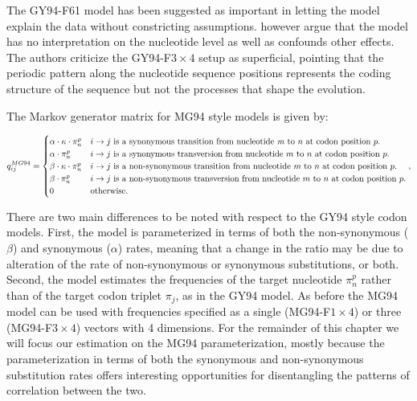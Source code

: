 The GY94-F61 model has been suggested as important in letting the model explain the data without constricting assumptions.
\citet{Rodrigue2008} however argue that the model has no interpretation on the nucleotide level as well as confounds other effects. 
The authors criticize the GY94-F$3\times4$ setup as superficial, pointing that the periodic pattern along the nucleotide sequence positions represents the coding structure of the sequence but not the processes that shape the evolution.

The Markov generator matrix for MG94 style models \citep{Muse1994} is given by:

\footnotesize{
\begin{equation}
q_{ij}^{MG94}=\begin{cases}
\alpha\cdot\kappa\cdot\pi_{n}^{p} & i\rightarrow j\text{ is a synonymous transition from nucleotide \textit{m} to \ensuremath{n} at codon position \ensuremath{p}.}\\
\alpha\cdot\pi_{n}^{p} & i\rightarrow j\text{ is a synonymous transversion from nucleotide \ensuremath{m} to \ensuremath{n} at codon position \ensuremath{p}.}\\
\beta\cdot\kappa\cdot\pi_{n}^{p} & i\rightarrow j\text{ is a non-synonymous transition from nucleotide \ensuremath{m} to \ensuremath{n} at codon position \ensuremath{p}.}\\
\beta\cdot\pi_{n}^{p} & i\rightarrow j\text{ is a non-synonymous transversion from nucleotide \ensuremath{m} to \ensuremath{n} at codon position \ensuremath{p}.}\\
0 & \text{otherwise.}
\end{cases},
\label{eq:mg94}
\end{equation}
} %

There are two main differences to be noted with respect to the GY94 style codon models.
First, the model is parameterized in terms of both the non-synonymous ($\beta$) and synonymous ($\alpha$) rates, meaning that a change in the ratio may be due to alteration of the rate of non-synonymous or synonymous substitutions, or both.
Second, the model estimates the frequencies of the target nucleotide $\pi_{n}^{p}$ rather than of the target codon triplet $\pi_{j}$, as in the GY94 model.
As before the MG94 model can be used with frequencies specified as a single (MG94-F$1\times4$) or three (MG94-F$3\times4$) vectors with 4 dimensions.
For the remainder of this chapter we will focus our estimation on the MG94 parameterization, mostly because the parameterization in terms of both the synonymous and non-synonymous substitution rates offers interesting opportunities for disentangling the patterns of correlation between the two.


